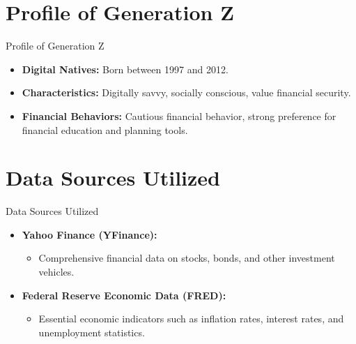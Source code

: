 \documentclass{beamer}
\begin{document}
\section{Profile of Generation Z}
\begin{frame}{Profile of Generation Z}
        \begin{itemize}
            \item \textbf{Digital Natives:} Born between 1997 and 2012.
            \item \textbf{Characteristics:} Digitally savvy, socially conscious, value financial security.
            \item \textbf{Financial Behaviors:} Cautious financial behavior, strong preference for financial education and planning tools.
        \end{itemize}
\end{frame}

\section{Data Sources Utilized}
\begin{frame}{Data Sources Utilized}
        \begin{itemize}
            \item \textbf{Yahoo Finance (YFinance):}
            \begin{itemize}
                \item Comprehensive financial data on stocks, bonds, and other investment vehicles.
            \end{itemize}
            \item \textbf{Federal Reserve Economic Data (FRED):}
            \begin{itemize}
                \item Essential economic indicators such as inflation rates, interest rates, and unemployment statistics.
            \end{itemize}
        \end{itemize}
\end{frame}
\end{document}
